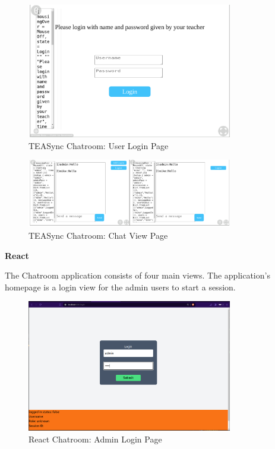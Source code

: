 \begin{figure}[H]
    \centering
    \includegraphics[width=0.8\textwidth]{diagrams/TEASyncChatroomUSerLogin.png}
    \caption{TEASync Chatroom: User Login Page}
    \label{fig:enter-label}
\end{figure}


\begin{figure}[ht]
    \centering
    \includegraphics[width=0.8\textwidth]{diagrams/ChatroomMainMultiView.png}
    \caption{TEASync Chatroom: Chat View Page}
    \label{fig:enter-label}
\end{figure}


\textbf{React}

The Chatroom application consists of four main views. The application's homepage is a login view for the admin users to start a session.
\begin{figure}[H]
    \centering
    \includegraphics[width=0.8\textwidth]{diagrams/ChatroomAdminLogin.png}
    \caption{React Chatroom: Admin Login Page}
    \label{fig:enter-label}
\end{figure}

